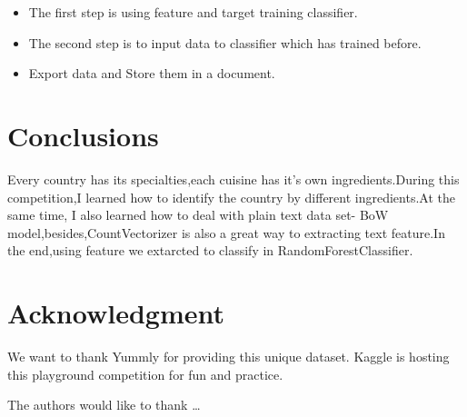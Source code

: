 \begin{itemize}
\begin{itemize}
\item
The first step is using feature and target training classifier.
\item
The second step is to input data to classifier which has trained before.
\item 
Export data and Store them in a document.
\end{itemize}


\end{itemize}







\section{Conclusions} \label{sec-conclusions}
Every country has its specialties,each cuisine has it's own ingredients.During this competition,I learned how to
identify the country by different ingredients.At the same time, I also learned how to deal with plain text data set-
BoW model,besides,CountVectorizer is also a great way to extracting text feature.In the end,using feature we extarcted to
classify in RandomForestClassifier.



\section*{Acknowledgment}

We want to thank Yummly for providing this unique dataset. Kaggle is hosting this playground competition for fun and practice.

The authors would like to thank \ldots
